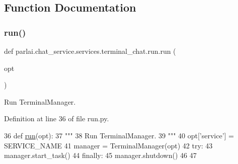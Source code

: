 \subsection{Function Documentation}
\mbox{\label{namespaceparlai_1_1chat__service_1_1services_1_1terminal__chat_1_1run_a2d090fbaf981ed8221ad1a1e5be061ea}} 
\subsubsection{\texorpdfstring{run()}{run()}}
{\footnotesize\ttfamily def parlai.\+chat\+\_\+service.\+services.\+terminal\+\_\+chat.\+run.\+run (\begin{DoxyParamCaption}\item[{}]{opt }\end{DoxyParamCaption})}

\begin{DoxyVerb}Run TerminalManager.
\end{DoxyVerb}
 

Definition at line 36 of file run.\+py.


\begin{DoxyCode}
36 \textcolor{keyword}{def }\hyperlink{namespaceparlai_1_1tasks_1_1talkthewalk_1_1run_a0a1ec08b8196cb008e4df83468c67e5b}{run}(opt):
37     \textcolor{stringliteral}{"""}
38 \textcolor{stringliteral}{    Run TerminalManager.}
39 \textcolor{stringliteral}{    """}
40     opt[\textcolor{stringliteral}{'service'}] = SERVICE\_NAME
41     manager = TerminalManager(opt)
42     \textcolor{keywordflow}{try}:
43         manager.start\_task()
44     \textcolor{keywordflow}{finally}:
45         manager.shutdown()
46 
47 
\end{DoxyCode}
\mbox{\label{namespaceparlai_1_1chat__service_1_1services_1_1terminal__chat_1_1run_a644a131d95fe6a2053b91eddd022fbf6}} 
